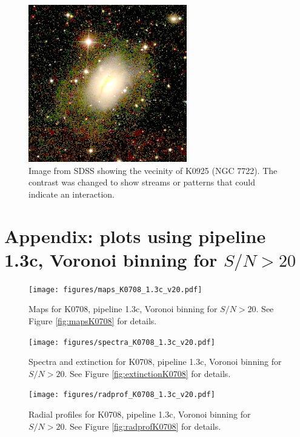 \documentclass[a4paper]{article}
\begin{document}
\begin{figure}
\begin{center}
\includegraphics[width=0.6\columnwidth]{figures/K0925_enh.png}
\end{center}

\caption{Image from SDSS showing the vecinity of K0925 (NGC 7722). The contrast
was changed to show streams or patterns that could indicate an interaction.}
\label{fig:sdssK0925_enh}
\end{figure}




\appendix

\section{Appendix: plots using pipeline 1.3c, Voronoi binning for $S/N > 20$}
\label{sec:app13c}

\begin{figure}[H]
\texttt{[image: figures/maps\_K0708\_1.3c\_v20.pdf]}
\caption{Maps for K0708, pipeline 1.3c, Voronoi binning for $S/N > 20$. See
Figure \ref{fig:mapsK0708} for details.}
\label{fig:maps_K0708_13c_v20}
\end{figure}

\begin{figure}[H]
\texttt{[image: figures/spectra\_K0708\_1.3c\_v20.pdf]}
\caption{Spectra and extinction for K0708, pipeline 1.3c, Voronoi binning for
$S/N > 20$. See Figure \ref{fig:extinctionK0708} for details.}
\end{figure}

\begin{figure}[H]
\texttt{[image: figures/radprof\_K0708\_1.3c\_v20.pdf]}
\caption{Radial profiles for K0708, pipeline 1.3c, Voronoi binning for $S/N >
20$. See Figure \ref{fig:radprofK0708} for details.}
\end{figure}
\end{document}
